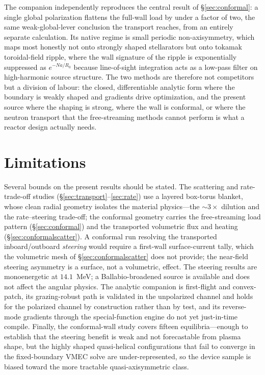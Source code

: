\documentclass[11pt]{article}
\begin{document}
The companion independently reproduces the central result of \S\ref{sec:conformal}: a
single global polarization flattens the full-wall load by under a factor of two, the same
weak-global-lever conclusion the transport reaches, from an entirely separate calculation.
Its native regime is small periodic non-axisymmetry, which maps most honestly not onto
strongly shaped stellarators but onto tokamak toroidal-field ripple, where the wall
signature of the ripple is exponentially suppressed as $e^{-N a/R_0}$ because line-of-sight
integration acts as a low-pass filter on high-harmonic source structure. The two methods
are therefore not competitors but a division of labour: the closed, differentiable analytic
form where the boundary is weakly shaped and gradients drive optimization, and the present
source where the shaping is strong, where the wall is conformal, or where the neutron
transport that the free-streaming methods cannot perform is what a reactor design actually
needs.

\section{Limitations}
\label{sec:limitations}

Several bounds on the present results should be stated. The scattering and rate-trade-off
studies (\S\ref{sec:transport}--\ref{sec:rate}) use a layered box-torus blanket, whose clean
radial geometry isolates the material physics---the $\sim\!3\times$ dilution and the
rate--steering trade-off; the conformal geometry carries the free-streaming load pattern
(\S\ref{sec:conformal}) and the transported volumetric flux and heating
(\S\ref{sec:conformalscatter}). A conformal run resolving the transported inboard/outboard
\emph{steering} would require a first-wall surface-current tally, which the volumetric mesh
of \S\ref{sec:conformalscatter} does not provide; the near-field steering asymmetry is a
surface, not a volumetric, effect. The steering results are monoenergetic at $14.1$~MeV; a
Ballabio-broadened source is available and does not affect the angular physics. The
analytic companion is first-flight and convex-patch, its grazing-robust path is validated
in the unpolarized channel and holds for the polarized channel by construction rather than
by test, and its reverse-mode gradients through the special-function engine do not yet
just-in-time compile. Finally, the conformal-wall study covers fifteen equilibria---enough
to establish that the steering benefit is weak and not forecastable from plasma shape, but
the highly shaped quasi-helical configurations that fail to converge in the fixed-boundary
VMEC solve are under-represented, so the device sample is biased toward the more tractable
quasi-axisymmetric class.
\end{document}
